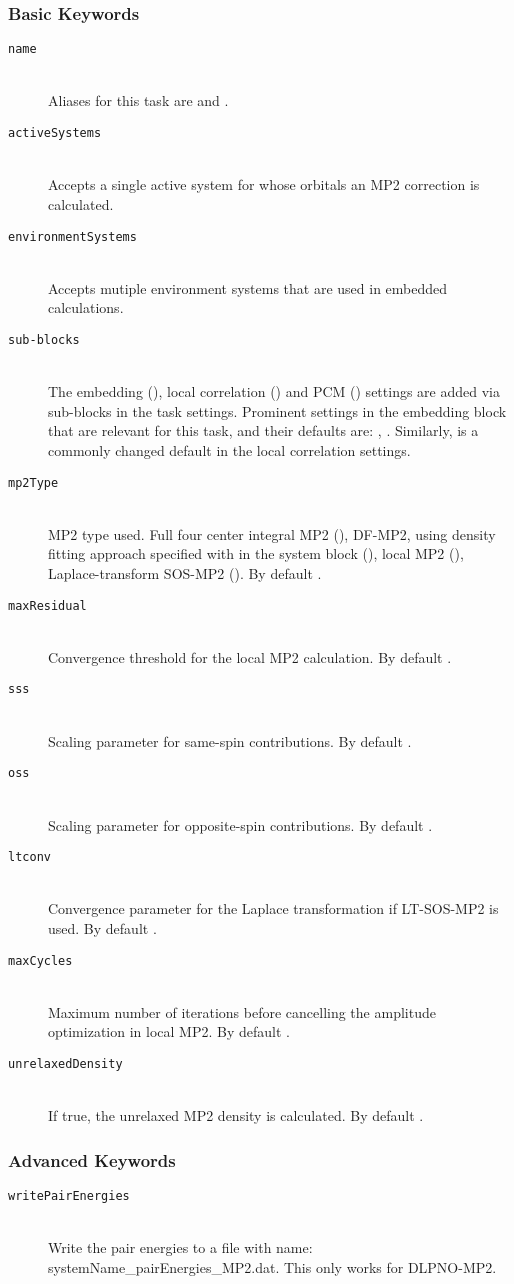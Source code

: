\subsubsection{Basic Keywords}
\begin{description}
	\item [\texttt{name}]\hfill \\
	Aliases for this task are  and .
	\item [\texttt{activeSystems}]\hfill \\
	Accepts a single active system for whose orbitals an MP2 correction is calculated.
	\item [\texttt{environmentSystems}]\hfill \\
	Accepts mutiple environment systems that are used in embedded calculations.
	\item [\texttt{sub-blocks}]\hfill \\
	The embedding (), local correlation () and PCM () settings are added via sub-blocks in the task settings.
	Prominent settings in the embedding block that are relevant for this task, and their defaults are:
	, .
	Similarly,  is a commonly changed default in the local correlation settings.
	\item [\texttt{mp2Type}] \hfill \\ 
	MP2 type used. Full four center integral MP2 (), DF-MP2, using density fitting approach specified with  in the system block (), local MP2 (), Laplace-transform SOS-MP2 (). By default .
  \item[\texttt{maxResidual}]\hfill \\
	Convergence threshold for the local MP2 calculation. By default .
  \item[\texttt{sss}]\hfill \\
	Scaling parameter for same-spin contributions. By default .
  \item[\texttt{oss}]\hfill \\
	Scaling parameter for opposite-spin contributions. By default .
  \item[\texttt{ltconv}]\hfill \\
	Convergence parameter for the Laplace transformation if LT-SOS-MP2 is used. By default .
  \item[\texttt{maxCycles}]\hfill \\
  Maximum number of iterations before cancelling the amplitude optimization in local MP2. By default .
  \item[\texttt{unrelaxedDensity}]\hfill \\
  If true, the unrelaxed MP2 density is calculated. By default . 
\end{description}
\subsubsection{Advanced Keywords}
\begin{description}
  \item [\texttt{writePairEnergies}]\hfill \\
  Write the pair energies to a file with name: systemName\_pairEnergies\_MP2.dat.
  This only works for DLPNO-MP2.
\end{description}
